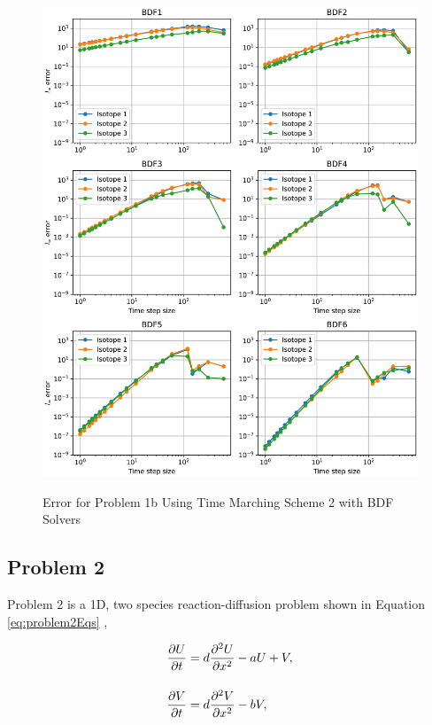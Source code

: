 \begin{figure}[t]
  \centering
  \includegraphics[width=6.5in]{images/problem1bMethod2Int.png}\\
  \caption{Error for Problem 1b Using Time Marching Scheme 2 with BDF Solvers}
  \label{fig:errorProblem1bTimeMarchingScheme2Int}
\end{figure} 

\FloatBarrier

\subsection{Problem 2}
Problem 2 is a 1D, two species reaction-diffusion problem shown in Equation \ref{eq:problem2Eqs} \cite{ching2007},

\begin{equation}
\setlength{\jot}{15pt}
\begin{split}
    \frac{\partial U}{\partial t} &= d\frac{\partial^{2}U}{\partial x^{2}} - aU + V, \\
    \frac{\partial V}{\partial t} &=
    d\frac{\partial^{2}V}{\partial x^{2}} - bV,
\end{split}
    \label{eq:problem2Eqs}
\end{equation}

